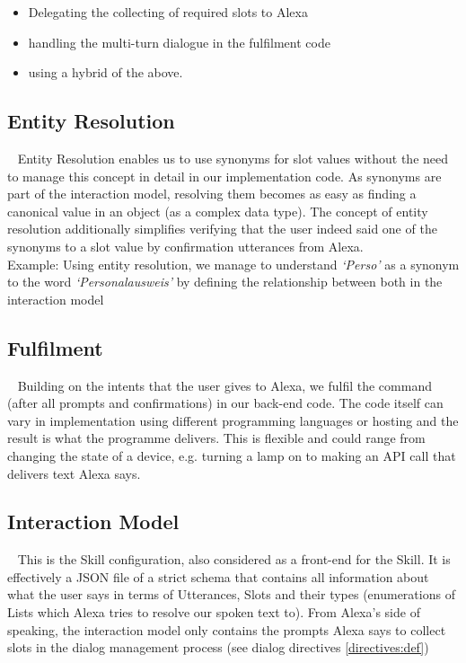 	\begin{itemize}
		\itemsep0em
		\item Delegating the collecting of required slots to Alexa
		\item handling the multi-turn dialogue in the fulfilment code
		\item using a hybrid of the above.

	\end{itemize}
	
	
	
	\subsection*{Entity Resolution}~\label{entityRes:def}	
	Entity Resolution enables us to use synonyms for slot values without the need to manage this concept in detail in our implementation code. As synonyms are part of the interaction model, resolving them becomes as easy as finding a canonical value in an object (as a complex data type). The concept of entity resolution additionally simplifies verifying that the user indeed said one of the synonyms to a slot value by confirmation utterances from Alexa.\\
	Example: Using entity resolution, we manage to understand \textit{`Perso'} as a synonym to the word \textit{`Personalausweis'} by defining the relationship between both in the interaction model
	
	
	\subsection*{Fulfilment}~\label{fulfillment:def}	
	Building on the intents that the user gives to Alexa, we %
	fulfil the command (after all prompts and confirmations) %
	in our back-end code. %
	The code itself can vary in implementation using different programming languages %
	or 
	hosting %
	and the result is what the programme delivers. This is flexible and could range from changing the state of a device, e.g. turning a lamp on to making an API call that delivers text Alexa says. %
	
	\subsection*{Interaction Model}~\label{interactionMdl:def}
	This is the Skill configuration, also considered as a front-end for the Skill. It is effectively a JSON file of a strict schema that contains all information about what the user says in terms of Utterances, Slots and their types (enumerations of Lists which Alexa tries to resolve our spoken text to). From Alexa's side of speaking, the interaction model only contains the prompts Alexa says to collect slots in the dialog management process (see dialog directives \ref{directives:def})
	
